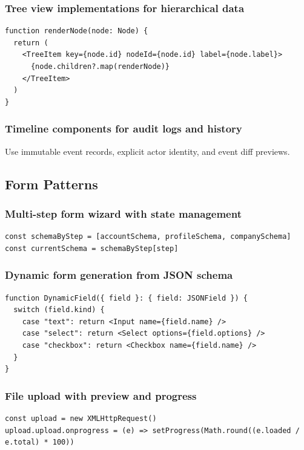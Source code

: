 \subsubsection{Tree view implementations for hierarchical data}
\begin{verbatim}
function renderNode(node: Node) {
  return (
    <TreeItem key={node.id} nodeId={node.id} label={node.label}>
      {node.children?.map(renderNode)}
    </TreeItem>
  )
}
\end{verbatim}

\subsubsection{Timeline components for audit logs and history}
Use immutable event records, explicit actor identity, and event diff previews.

\subsection{Form Patterns}

\subsubsection{Multi-step form wizard with state management}
\begin{verbatim}
const schemaByStep = [accountSchema, profileSchema, companySchema]
const currentSchema = schemaByStep[step]
\end{verbatim}

\subsubsection{Dynamic form generation from JSON schema}
\begin{verbatim}
function DynamicField({ field }: { field: JSONField }) {
  switch (field.kind) {
    case "text": return <Input name={field.name} />
    case "select": return <Select options={field.options} />
    case "checkbox": return <Checkbox name={field.name} />
  }
}
\end{verbatim}

\subsubsection{File upload with preview and progress}
\begin{verbatim}
const upload = new XMLHttpRequest()
upload.upload.onprogress = (e) => setProgress(Math.round((e.loaded / e.total) * 100))
\end{verbatim}

